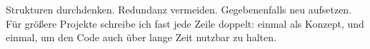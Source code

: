 
\begin{frame}
%
\begin{hintbox}[Fazit]
Strukturen durchdenken. Redundanz vermeiden. Gegebenenfalls neu aufsetzen.\\

Für größere Projekte schreibe ich fast jede Zeile doppelt: einmal als Konzept, und einmal, um den Code auch über lange Zeit nutzbar zu halten.
\end{hintbox}
%
\end{frame}